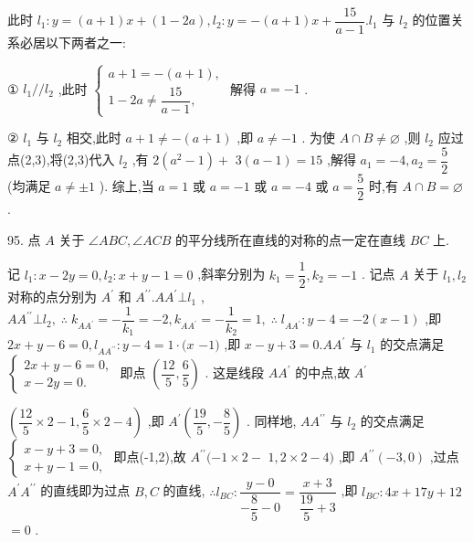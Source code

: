 此时 ${l}_{1} : y = \left( {a + 1}\right) x + \left( {1 - {2a}}\right) ,{l}_{2} : y =  - \left( {a + 1}\right) x + \dfrac{15}{a - 1}.{l}_{1}$ 与 ${l}_{2}$ 的位置关系必居以下两者之一:

① ${l}_{1}//{l}_{2}$ ,此时 $\left\{  \begin{array}{l} a + 1 =  - \left( {a + 1}\right) , \\  1 - {2a} \neq  \dfrac{15}{a - 1}, \end{array}\right.$ 解得 $a =  - 1$ .

② ${l}_{1}$ 与 ${l}_{2}$ 相交,此时 $a + 1 \neq   - \left( {a + 1}\right)$ ,即 $a \neq   - 1$ . 为使 $A \cap  B \neq  \varnothing$ ,则 ${l}_{2}$ 应过点(2,3),将(2,3)代入 ${l}_{2}$ ,有 $2\left( {{a}^{2} - 1}\right)  +$  $3\left( {a - 1}\right)  = {15}$ ,解得 ${a}_{1} =  - 4,{a}_{2} = \dfrac{5}{2}$ (均满足 $a \neq   \pm  1$ ). 综上,当 $a = 1$ 或 $a =  - 1$ 或 $a =  - 4$ 或 $a = \dfrac{5}{2}$ 时,有 $A \cap  B = \varnothing$ .

95. 点 $A$ 关于 $\angle {ABC},\angle {ACB}$ 的平分线所在直线的对称的点一定在直线 ${BC}$ 上.

记 ${l}_{1} : x - {2y} = 0,{l}_{2} : x + y - 1 = 0$ ,斜率分别为 ${k}_{1} = \dfrac{1}{2},{k}_{2} =  - 1$ . 记点 $A$ 关于 ${l}_{1},{l}_{2}$ 对称的点分别为 ${A}^{\prime }$ 和 ${A}^{\prime \prime }.A{A}^{\prime }\bot {l}_{1}$ , $A{A}^{\prime \prime } \bot  {l}_{2},\;\therefore \;{k}_{A{A}^{\prime }} =  - \dfrac{1}{{k}_{1}} =  - 2,{k}_{A{A}^{\prime }} =  - \dfrac{1}{{k}_{2}} = 1,\;\therefore \;{l}_{A{A}^{\prime }} : y - 4 =  - 2\left( {x - 1}\right)$ ,即 ${2x} + y - 6 = 0,{l}_{A{A}^{\prime \prime }} : y - 4 = 1 \cdot  (x$  $- 1)$ ,即 $x - y + 3 = 0.A{A}^{\prime }$ 与 ${l}_{1}$ 的交点满足 $\left\{  \begin{array}{l} {2x} + y - 6 = 0, \\  x - {2y} = 0. \end{array}\right.$ 即点 $\left( {\dfrac{12}{5},\dfrac{6}{5}}\right)$ . 这是线段 $A{A}^{\prime }$ 的中点,故 ${A}^{\prime }$

$\left( {\dfrac{12}{5} \times  2 - 1,\dfrac{6}{5} \times  2 - 4}\right)$ ,即 ${A}^{\prime }\left( {\dfrac{19}{5}, - \dfrac{8}{5}}\right)$ . 同样地, $A{A}^{\prime \prime }$ 与 ${l}_{2}$ 的交点满足 $\left\{  \begin{array}{l} x - y + 3 = 0, \\  x + y - 1 = 0, \end{array}\right.$ 即点(-1,2),故 ${A}^{\prime \prime }( - 1 \times  2 -$  $1,2 \times  2 - 4)$ ,即 ${A}^{\prime \prime }\left( {-3,0}\right)$ ,过点 ${A}^{\prime }{A}^{\prime \prime }$ 的直线即为过点 $B,C$ 的直线, $\therefore {l}_{BC} : \dfrac{y - 0}{-\dfrac{8}{5} - 0} = \dfrac{x + 3}{\dfrac{19}{5} + 3}$ ,即 ${l}_{BC} : {4x} + {17y} + {12}$  $= 0$ .

